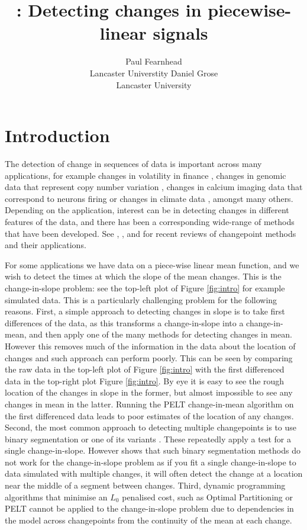\documentclass[nojss]{jss}
\author{Paul Fearnhead\\Lancaster Universtity \And 
        Daniel Grose\\Lancaster University}
\title{\pkg{cpop}: Detecting changes in piecewise-linear signals}
\begin{document}

\section[Introduction]{Introduction}

The detection of change in sequences of data is important across many applications, for example changes in volatility in finance \citep{andreou2002detecting}, changes in genomic data that represent copy number variation \citep{niu2012screening}, changes in calcium imaging data that correspond to neurons firing \citep{jewell2020fast} or changes in climate data \citep{reeves2007review}, amongst many others.  Depending on the application, interest can be in detecting changes in different features of the data, and there has been a corresponding wide-range of methods that have been developed. See \cite{aminikhanghahi2017survey}, \cite{truong2020selective}, \cite{fearnhead2020relating} and \cite{shi2022comparison} for recent reviews of changepoint methods and their applications.

For some applications we have data on a piece-wise linear mean function, and we wish to detect the times at which the slope of the mean changes. This is the change-in-slope problem: see the top-left plot of Figure \ref{fig:intro} for example simulated data.  This is a particularly challenging problem for the following reasons. First, a simple approach to detecting changes in slope is to take first differences of the data, as this transforms a change-in-slope into a change-in-mean, and then apply one of the many methods for detecting changes in mean. However this removes much of the information in the data about the location of changes and such approach can perform poorly. This can be seen by comparing the raw data in the top-left plot of Figure \ref{fig:intro} with the first differenced data in the top-right plot Figure \ref{fig:intro}. By eye it is easy to see the rough location of the changes in slope in the former, but almost impossible to see any changes in mean in the latter. Running the PELT change-in-mean algorithm \cite{killick2012optimal} on the first differenced data leads to poor estimates of the location of any changes. Second, the most common approach to detecting multiple changepoints is to use binary segmentation \citep{scott1974cluster} or one of its variants \citep{fryzlewicz2014wild,kovacs2020seeded}. These repeatedly apply a test for a single change-in-slope. However \cite{baranowski2016narrowest} shows that such binary segmentation methods do not work for the change-in-slope problem as if you fit a single change-in-slope to data simulated with multiple changes, it will often detect the change at a location near the middle of a segment between changes. Third, dynamic programming algorithms that minimise an $L_0$ penalised cost, such as Optimal Partitioning \citep{jackson2005algorithm} or PELT \citep{killick2012optimal} cannot be applied to the change-in-slope problem due to dependencies in the model across changepoints from the continuity of the mean at each change. 
\end{document}
